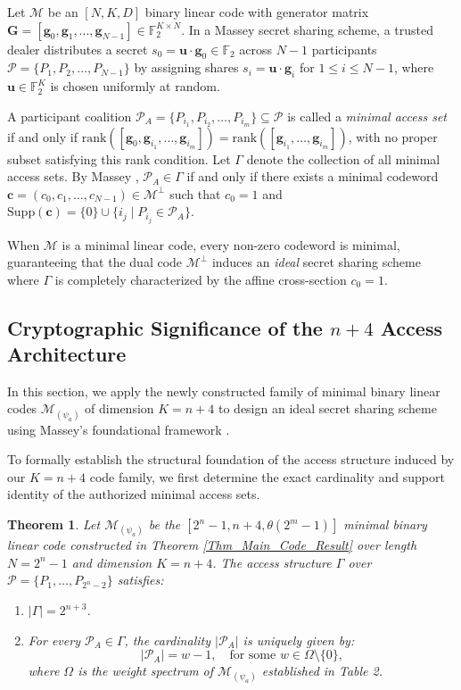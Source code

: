 \documentclass[pdflatex,sn-mathphys-num]{sn-jnl}%
\theoremstyle{thmstyleone}%
\newtheorem{theorem}{Theorem}%
\theoremstyle{thmstyletwo}%
\theoremstyle{thmstylethree}%
\begin{document}
Let $\mathcal{M}$ be an $[N, K, D]$ binary linear code with generator matrix $\mathbf{G} = [\mathbf{g}_0, \mathbf{g}_1, \ldots, \mathbf{g}_{N-1}] \in \mathbb{F}_2^{K \times N}$. In a Massey secret sharing scheme, a trusted dealer distributes a secret $s_0 = \mathbf{u} \cdot \mathbf{g}_0 \in \mathbb{F}_2$ across $N-1$ participants $\mathcal{P} = \{P_1, P_2, \ldots, P_{N-1}\}$ by assigning shares $s_i = \mathbf{u} \cdot \mathbf{g}_i$ for $1 \le i \le N-1$, where $\mathbf{u} \in \mathbb{F}_2^K$ is chosen uniformly at random.

A participant coalition $\mathcal{P}_A = \{P_{i_1}, P_{i_2}, \ldots, P_{i_m}\} \subseteq \mathcal{P}$ is called a \emph{minimal access set} if and only if $\text{rank}([\mathbf{g}_0, \mathbf{g}_{i_1}, \ldots, \mathbf{g}_{i_m}]) = \text{rank}([\mathbf{g}_{i_1}, \ldots, \mathbf{g}_{i_m}])$, with no proper subset satisfying this rank condition. Let $\Gamma$ denote the collection of all minimal access sets. By Massey \cite{Massey1993}, $\mathcal{P}_A \in \Gamma$ if and only if there exists a minimal codeword $\mathbf{c} = (c_0, c_1, \ldots, c_{N-1}) \in \mathcal{M}^\perp$ such that $c_0 = 1$ and $\mathrm{Supp}(\mathbf{c}) = \{0\} \cup \{i_j \mid P_{i_j} \in \mathcal{P}_A\}$.

When $\mathcal{M}$ is a minimal linear code, every non-zero codeword is minimal, guaranteeing that the dual code $\mathcal{M}^\perp$ induces an \emph{ideal} secret sharing scheme where $\Gamma$ is completely characterized by the affine cross-section $c_0 = 1$.



\subsection{Cryptographic Significance of the $n+4$ Access Architecture}
 In this section, we apply the newly constructed family of minimal binary linear codes $\mathcal{M}_{(\psi_a)}$ of dimension $K = n+4$ to design an ideal secret sharing scheme using Massey's foundational framework \cite{Massey1993}.

To formally establish the structural foundation of the access structure induced by our $K = n+4$ code family, we first determine the exact cardinality and support identity of the authorized minimal access sets.

\begin{theorem}\label{Thm:SSS_Construction}
Let $\mathcal{M}_{(\psi_a)}$ be the $[2^n-1, n+4, \theta(2^m-1)]$ minimal binary linear code constructed in Theorem \ref{Thm_Main_Code_Result} over length $N = 2^n - 1$ and dimension $K = n+4$. The access structure $\Gamma$ over $\mathcal{P} = \{P_1, \ldots, P_{2^n-2}\}$ satisfies:
\begin{enumerate}
    \item  $|\Gamma| = 2^{n+3}$.
    \item  For every $\mathcal{P}_A \in \Gamma$, the cardinality $|\mathcal{P}_A|$ is uniquely given by:
    \[
    |\mathcal{P}_A| = w - 1, \quad \text{for some } w \in \Omega \setminus \{0\},
    \]
    where $\Omega$ is the weight spectrum of $\mathcal{M}_{(\psi_a)}$ established in Table 2.
\end{enumerate}
\end{theorem}
\end{document}

